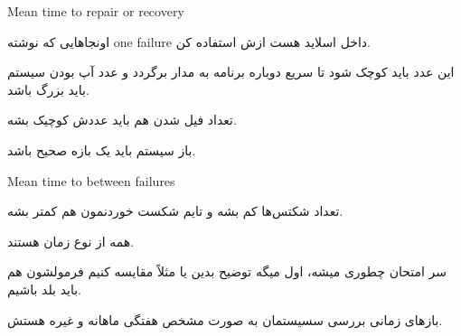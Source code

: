 Mean time to repair or recovery

اونجاهایی که نوشته one failure داخل اسلاید هست ازش استفاده کن.

این عدد باید کوچک شود تا سریع دوباره برنامه به مدار برگردد و عدد آپ بودن سیستم
باید بزرگ باشد.

تعداد فیل شدن هم باید عددش کوچیک بشه.

باز سیستم باید یک بازه صحیح باشد.

Mean time to between failures

تعداد شکتس‌ها کم بشه و تایم شکست خوردنمون هم کمتر بشه.

همه از نوع زمان‌ هستند.

سر امتحان چطوری میشه، اول میگه توضیح بدین یا مثلاً مقایسه کنیم فرمولشون هم باید
بلد باشیم.

باز‌های زمانی بررسی سسیستمان به صورت مشخص هفتگی ماهانه و غیره هستش.


